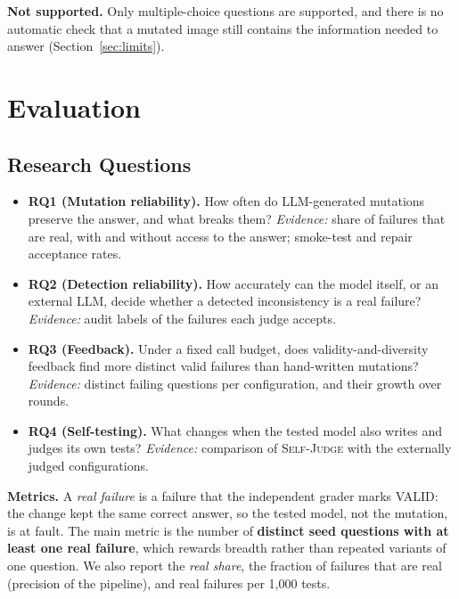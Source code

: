 \documentclass[sigconf]{acmart}
\newcommand{\SJ}{\textsc{Self-Judge}}
\begin{document}
\textbf{Not supported.} Only multiple-choice questions are supported, and there is no automatic check that a mutated
image still contains the information needed to answer (Section~\ref{sec:limits}).

\section{Evaluation}

\subsection{Research Questions}
\label{sec:rqs}

\begin{itemize}[leftmargin=*]
  \item \textbf{RQ1 (Mutation reliability).} How often do LLM-generated mutations preserve the answer, and what breaks
        them? \emph{Evidence:} share of failures that are real, with and without access to the answer; smoke-test and
        repair acceptance rates.
  \item \textbf{RQ2 (Detection reliability).} How accurately can the model itself, or an external LLM, decide whether a
        detected inconsistency is a real failure? \emph{Evidence:} audit labels of the failures each judge accepts.
  \item \textbf{RQ3 (Feedback).} Under a fixed call budget, does validity-and-diversity feedback find more distinct
        valid failures than hand-written mutations? \emph{Evidence:} distinct failing questions per configuration,
        and their growth over rounds.
  \item \textbf{RQ4 (Self-testing).} What changes when the tested model also writes and judges its own tests?
        \emph{Evidence:} comparison of \SJ{} with the externally judged configurations.
\end{itemize}

\textbf{Metrics.} A \emph{real failure} is a failure that the independent grader marks VALID: the change kept the same
correct answer, so the tested model, not the mutation, is at fault. The main metric is the number of \textbf{distinct
seed questions with at least one real failure}, which rewards breadth rather than repeated variants of one question.
We also report the \emph{real share}, the fraction of failures that are real (precision of the pipeline), and real
failures per 1{,}000 tests.
\end{document}
